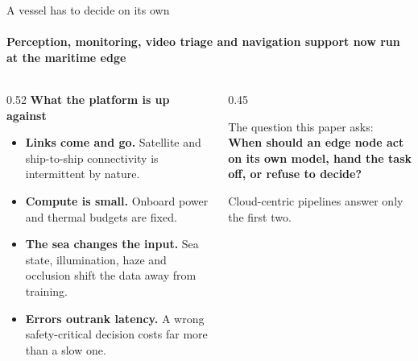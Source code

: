 \documentclass[aspectratio=169, 11pt]{beamer}
\newcommand{\callout}[2][wash]{%
  \begin{beamercolorbox}[wd=\textwidth, sep=0.55em]{}%
  \colorbox{#1}{\parbox{\dimexpr\textwidth-1.2em\relax}{\vspace{0.15em}#2\vspace{0.15em}}}%
  \end{beamercolorbox}}
\begin{document}
\begin{frame}{A vessel has to decide on its own}
\framesubtitle{Perception, monitoring, video triage and navigation support now run at the maritime edge}

\vspace{0.3em}
\begin{columns}[T]
\begin{column}{0.52\textwidth}
  \textbf{\color{navy}What the platform is up against}
  \begin{itemize}\setlength\itemsep{0.55em}
    \item \textbf{Links come and go.} Satellite and ship-to-ship connectivity is intermittent by nature.
    \item \textbf{Compute is small.} Onboard power and thermal budgets are fixed.
    \item \textbf{The sea changes the input.} Sea state, illumination, haze and occlusion shift the data away from training.
    \item \textbf{Errors outrank latency.} A wrong safety-critical decision costs far more than a slow one.
  \end{itemize}
\end{column}
\begin{column}{0.45\textwidth}
  \vspace{1.6em}
  \callout{\small The question this paper asks:\\[0.5em]
  {\color{navy}\bfseries When should an edge node act on its own model, hand the task off, or refuse to decide?}}

  \vspace{0.8em}
  {\color{ink2}\small Cloud-centric pipelines answer only the first two.}
\end{column}
\end{columns}
\end{frame}
\end{document}
